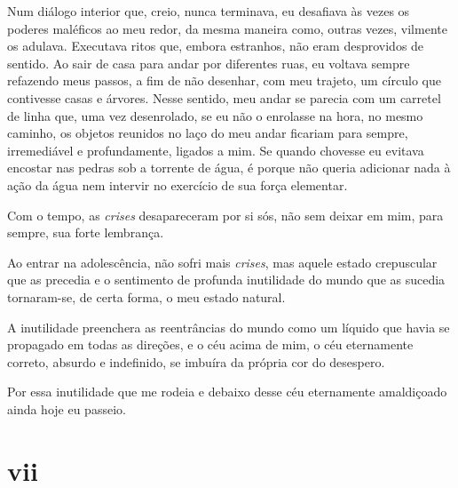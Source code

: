 Num diálogo interior que, creio, nunca terminava, eu desafiava às vezes os
poderes maléficos ao meu redor, da mesma maneira como, outras vezes, vilmente
os adulava. Executava ritos que, embora estranhos, não eram desprovidos de
sentido. Ao sair de casa para andar por diferentes ruas, eu voltava sempre
refazendo meus passos, a fim de não desenhar, com meu trajeto, um círculo que
contivesse casas e árvores. Nesse sentido, meu andar se parecia com um
carretel de linha que, uma vez desenrolado, se eu não o enrolasse na hora, no
mesmo caminho, os objetos reunidos no laço do meu andar ficariam para sempre,
irremediável e profundamente, ligados a mim. Se quando chovesse eu evitava
encostar nas pedras sob a torrente de água, é porque não queria adicionar
nada à ação da água nem intervir no exercício de sua força elementar.



Com o tempo, as \textit{crises} desapareceram por si sós, não sem deixar em
mim, para sempre, sua forte lembrança.

Ao entrar na adolescência, não sofri mais \textit{crises}, mas aquele estado
crepuscular que as precedia e o sentimento de profunda inutilidade do mundo
que as sucedia tornaram-se, de certa forma, o meu estado natural.

A inutilidade preenchera as reentrâncias do mundo como um líquido que havia se
propagado em todas as direções, e o céu acima de mim, o céu eternamente
correto, absurdo e indefinido, se imbuíra da própria cor do desespero. 

Por essa inutilidade que me rodeia e debaixo desse céu eternamente amaldiçoado
ainda hoje eu passeio.


\section{vii} 

 

